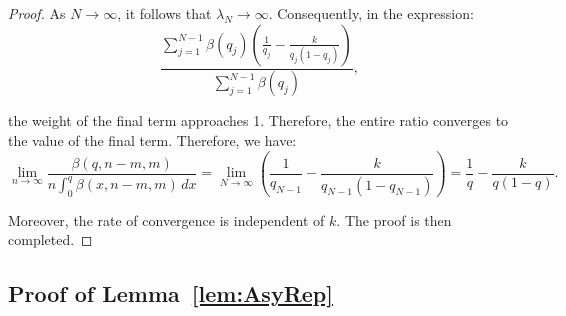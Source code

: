 \begin{proof}
As \( N \to \infty \), it follows that \( \lambda_N \to \infty \). Consequently, in the expression:
\[
\frac{\sum_{j=1}^{N-1} \beta(q_j) \left( \frac{1}{q_j} - \frac{k}{q_j(1-q_j)} \right)}{\sum_{j=1}^{N-1} \beta(q_j)},
\]

the weight of the final term approaches 1. Therefore, the entire ratio converges to the value of the final term. Therefore, we have:
\[
\lim_{n \to \infty} \frac{\beta(q, n-m, m)}{n \int_0^q \beta(x, n-m, m) \, dx} = \lim_{N \to \infty} \left( \frac{1}{q_{N-1}} - \frac{k}{q_{N-1}(1-q_{N-1})} \right)=\frac{1}{q} - \frac{k}{q(1-q)}.
\]

Moreover, the rate of convergence is independent of \( k \). The proof is then completed.
\end{proof}

\subsection*{Proof of Lemma~\ref{lem:AsyRep}}
